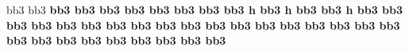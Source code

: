 
%
%
\def\freqbarno{9999}
%
\ifx\medleyflag\relax\else
  \nopagenumbers{}\medtall\medwidewidth\fi
\newpitch\newgrace\noautoglue
%
\relax
%
%
%
\debutmorceau
{}%
\leftrepeatsymbol
\notes\grg\bccc bb3{\bb\grd}{\bb\gre}\bb\etn
\dblf\qlf\ce\enotes\xbarre
\notes\grg\bccc bb3\bf{\bb\grN}\bb\etn
\dblf\qlf\ce\enotes\xbarre
\notes\grg\bccc bb3{\bb\grd}{\bb\gre}\bb\etn
\dblf\qlf\ce\enotes\xbarre
\notes\grg\bccc bb3{\bc\grd}{\ba\gre}\ba\etn
\grg\bccc bb3\bf\be\bc\enotes\suspmorceau
%
\reprmorceau
\notes\grg\bccc bb3{\bb\grd}{\bb\gre}\bb\etn
\dblf\qlf\ce\enotes\xbarre
\notes\grg\bccc bb3\bf{\bb\grN}\bb\etn
\dblf\qlf\ce\enotes\xbarre
\notes\grg\bccc bb3\bf\bg\bh\etn
\bccc bb3\be\bf\bh\enotes\xbarre
\notes\bccc bb3{\bc\grd}{\ba\gre}\ba\etn
\dble\qle\cc\enotes\setrightrepeat\suspmorceau
%
\reprmorceau
\leftrepeatsymbol
\notes\dblh\qlp h\etn
\hdblf\qlf\ce\enotes\xbarre
\notes\grg\bccc bb3\bf{\bb\grN}\bb\etn
\dblf\qlf\ce\enotes\xbarre
\notes\dblh\qlp h\etn
\hdblf\qlf\ce\enotes\xbarre
\notes\grg\bccc bb3{\bc\grd}{\ba\gre}\ba\etn
\grg\bccc bb3\bf\be\bc\enotes\suspmorceau
%
\reprmorceau
\notes\dblh\qlp h\etn
\hdblf\qlf\ce\enotes\xbarre
\notes\grg\bccc bb3\bf{\bb\grN}\bb\etn
\dblf\qlf\ce\enotes\xbarre
\notes\grg\bccc bb3\bf\bg\bh\etn
\bccc bb3\be\bf\bh\enotes\xbarre
\notes\bccc bb3{\bc\grd}{\ba\gre}\ba\etn
\dble\qle\cc\enotes\setrightrepeat\suspmorceau
%
\reprmorceau
\leftrepeatsymbol
\notes\grg\bccc bb3{\bb\grd}{\bb\gre}\bb\etn
\grg\bccc bb3{\bc\grd}{\bc\gre}\bc\enotes\xbarre
\notes\grg\bccc bb3{\bb\grd}{\bb\gre}\bb\etn
\dblf\qlf\ce\enotes\xbarre
\notes\grg\bccc bb3{\bc\grd}{\bc\gre}\bc\etn
\grg\bccc bb3{\bb\grd}{\bb\gre}\bb\enotes\xbarre
\notes\grg\bccc bb3{\ba\grd}{\ba\gre}\ba\etn
\grg\bccc bb3\bf\be\bc\enotes\suspmorceau
%
\reprmorceau
\notes\grg\bccc bb3{\bb\grd}{\bb\gre}\bb\etn
\grd\bccc bb3{\bc\gre}{\bb\grd}\bc\enotes\xbarre
\notes\grg\bccc bb3{\bb\grd}\bc\be\etn
\dblf\qlf\ce\enotes\xbarre
\notes\grg\bccc bb3\bf\bg\bh\etn
\bccc bb3\be\bf\bh\enotes\xbarre
\notes\bccc bb3{\bc\grd}{\ba\gre}\ba\etn
\dble\qle\cc\enotes\setrightrepeat\suspmorceau
%
\reprmorceau
\leftrepeatsymbol
\notes\bccc bb3\bh\bg\bh\etn
\hdblf\qlf\ce\enotes\xbarre
\notes\grg\bccc bb3\bf{\bb\grN}\bb\etn
\dblf\qlf\ce\enotes\xbarre
\notes\bccc bb3\bh\bg\bh\etn
\hdblf\qlf\ce\enotes\xbarre
\notes\grg\bccc bb3{\bc\grd}{\ba\gre}\ba\etn
\grg\bccc bb3\bf\be\bc\enotes\suspmorceau
%
\reprmorceau
\notes\bccc bb3\bh\bg\bh\etn
\hdblf\qlf\ce\enotes\xbarre
\notes\grg\bccc bb3\bf{\bb\grN}\bb\etn
\dblf\qlf\ce\enotes\xbarre
\notes\grg\bccc bb3\bf\bg\bh\etn
\bccc bb3\be\bf\bh\enotes\xbarre
\notes\bccc bb3{\bc\grd}{\ba\gre}\ba\etn
\dble\qle\cc\enotes\setrightrepeat\suspmorceau\byemedley
\bye
